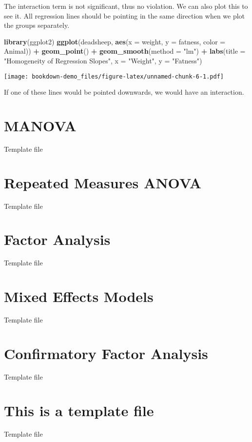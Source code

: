 \documentclass[]{book}
\newenvironment{Shaded}{\begin{snugshade}}{\end{snugshade}}
\newcommand{\KeywordTok}[1]{\textcolor[rgb]{0.13,0.29,0.53}{\textbf{#1}}}
\newcommand{\DataTypeTok}[1]{\textcolor[rgb]{0.13,0.29,0.53}{#1}}
\newcommand{\StringTok}[1]{\textcolor[rgb]{0.31,0.60,0.02}{#1}}
\newcommand{\OperatorTok}[1]{\textcolor[rgb]{0.81,0.36,0.00}{\textbf{#1}}}
\newcommand{\NormalTok}[1]{#1}
\theoremstyle{definition}
\theoremstyle{definition}
\theoremstyle{definition}
\theoremstyle{remark}
\begin{document}
The interaction term is not significant, thus no violation. We can also
plot this to see it. All regression lines should be pointing in the same
direction when we plot the groups separately.

\begin{Shaded}
\begin{Highlighting}[]
\KeywordTok{library}\NormalTok{(ggplot2)}
\KeywordTok{ggplot}\NormalTok{(deadsheep, }\KeywordTok{aes}\NormalTok{(}\DataTypeTok{x =}\NormalTok{ weight, }\DataTypeTok{y =}\NormalTok{ fatness, }\DataTypeTok{color =}\NormalTok{ Animal)) }\OperatorTok{+}\StringTok{ }
\StringTok{  }\KeywordTok{geom_point}\NormalTok{() }\OperatorTok{+}\StringTok{ }
\StringTok{  }\KeywordTok{geom_smooth}\NormalTok{(}\DataTypeTok{method =} \StringTok{"lm"}\NormalTok{) }\OperatorTok{+}\StringTok{ }
\StringTok{  }\KeywordTok{labs}\NormalTok{(}\DataTypeTok{title =} \StringTok{"Homogeneity of Regression Slopes"}\NormalTok{, }\DataTypeTok{x =} \StringTok{"Weight"}\NormalTok{, }\DataTypeTok{y =} \StringTok{"Fatness"}\NormalTok{)}
\end{Highlighting}
\end{Shaded}

\texttt{[image: bookdown-demo\_files/figure-latex/unnamed-chunk-6-1.pdf]}

If one of these lines would be pointed downwards, we would have an
interaction.

\chapter{MANOVA}\label{manova}

Template file

\chapter{Repeated Measures ANOVA}\label{repeated-measures-anova-1}

Template file

\chapter{Factor Analysis}\label{factor-analysis}

Template file

\chapter{Mixed Effects Models}\label{mixed-effects-models}

Template file

\chapter{Confirmatory Factor
Analysis}\label{confirmatory-factor-analysis}

Template file

\chapter{This is a template file}\label{this-is-a-template-file}

Template file


\end{document}
